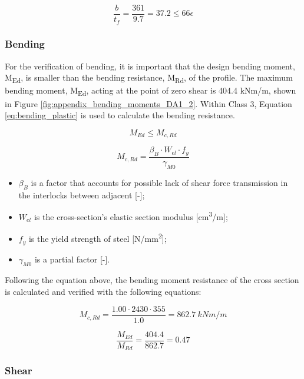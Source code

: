 \begin{equation}
    \frac{b}{t_{f}} = \frac{361}{9.7} = 37.2 \leq 66 \epsilon 
    \label{eq:class}
\end{equation}

\subsubsection{Bending}

For the verification of bending, it is important that the design bending moment, M\textsubscript{Ed}, is smaller than the bending resistance, M\textsubscript{Rd}, of the profile. The maximum bending moment, M\textsubscript{Ed}, acting at the point of zero shear is 404.4 kNm/m, shown in Figure \ref{fig:appendix_bending_moments_DA1_2}. Within Class 3, Equation \ref{eq:bending_plastic} is used to calculate the bending resistance.

\begin{equation}
    M_{Ed} \leq M_{c,Rd}
\end{equation}

\begin{equation}
    M_{c,Rd} = \frac{\beta_{B} \cdot W_{el} \cdot f_{y}}{\gamma_{M0}}
    \label{eq:bending_plastic}
\end{equation}

\begin{itemize}
  \item $\beta_B$ is a factor that accounts for possible lack of shear force transmission in the interlocks between adjacent [-];
  \item $W_{el}$ is the cross-section’s elastic section modulus [cm\textsuperscript{3}/m];
  \item $f_y$ is the yield strength of steel [N/mm\textsuperscript{2}];
  \item $\gamma_{M0}$ is a partial factor [-].
\end{itemize}

Following the equation above, the bending moment resistance of the cross section is calculated and verified with the following equations:

$$
    M_{c,Rd} = \frac{1.00 \cdot 2430 \cdot 355}{1.0} = 862.7 \ kNm/m
$$

$$
    \frac{M_{Ed}}{M_{Rd}} = \frac{404.4}{862.7} = 0.47
$$

\subsubsection{Shear}

